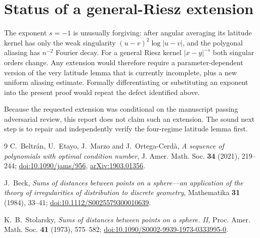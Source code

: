 \documentclass[11pt]{article}
\begin{document}
\section{Status of a general-Riesz extension}

The exponent $s=-1$ is unusually forgiving: after angular averaging its
latitude kernel has only the weak singularity
$(u-v)^2\log|u-v|$, and the polygonal aliasing has $n^{-2}$ Fourier decay.
For a general Riesz kernel $|x-y|^{-s}$ both singular orders change.  Any
extension would therefore require a parameter-dependent version of the very
latitude lemma that is currently incomplete, plus a new uniform aliasing
estimate.  Formally differentiating or substituting an exponent into the
present proof would repeat the defect identified above.

Because the requested extension was conditional on the manuscript passing
adversarial review, this report does not claim such an extension.  The sound
next step is to repair and independently verify the four-regime latitude
lemma first.

\begin{thebibliography}{9}
C.~Beltr\'an, U.~Etayo, J.~Marzo and J.~Ortega-Cerd\`a,
\emph{A sequence of polynomials with optimal condition number},
J. Amer. Math. Soc. \textbf{34} (2021), 219--244;
\href{https://doi.org/10.1090/jams/956}{doi:10.1090/jams/956},
\href{https://arxiv.org/abs/1903.01356}{arXiv:1903.01356}.

J.~Beck, \emph{Sums of distances between points on a sphere---an application
of the theory of irregularities of distribution to discrete geometry},
Mathematika \textbf{31} (1984), 33--41;
\href{https://doi.org/10.1112/S0025579300010639}{doi:10.1112/S0025579300010639}.

K.~B.~Stolarsky, \emph{Sums of distances between points on a sphere. II},
Proc. Amer. Math. Soc. \textbf{41} (1973), 575--582;
\href{https://doi.org/10.1090/S0002-9939-1973-0333995-0}{doi:10.1090/S0002-9939-1973-0333995-0}.
\end{thebibliography}
\end{document}
